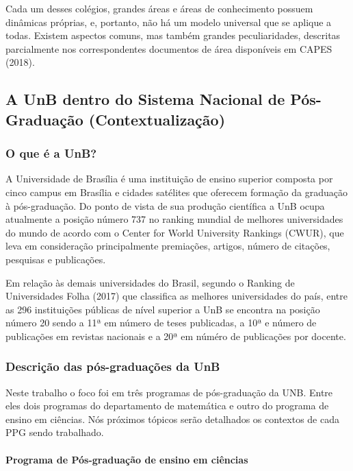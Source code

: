 \documentclass[]{article}
\let\oldparagraph\paragraph
\renewcommand{\paragraph}[1]{\oldparagraph{#1}\mbox{}}
\begin{document}
Cada um desses colégios, grandes áreas e áreas de conhecimento possuem
dinâmicas próprias, e, portanto, não há um modelo universal que se
aplique a todas. Existem aspectos comuns, mas também grandes
peculiaridades, descritas parcialmente nos correspondentes documentos de
área disponíveis em CAPES (2018).

\subsection{A UnB dentro do Sistema Nacional de Pós-Graduação
(Contextualização)}\label{a-unb-dentro-do-sistema-nacional-de-pos-graduacao-contextualizacao}

\subsubsection{O que é a UnB?}\label{o-que-e-a-unb}

A Universidade de Brasília é uma instituição de ensino superior composta
por cinco campus em Brasília e cidades satélites que oferecem formação
da graduação à pós-graduação. Do ponto de vista de sua produção
científica a UnB ocupa atualmente a posição número 737 no ranking
mundial de melhores universidades do mundo de acordo com o Center for
World University Rankings (CWUR), que leva em consideração
principalmente premiações, artigos, número de citações, pesquisas e
publicações.

Em relação às demais universidades do Brasil, segundo o Ranking de
Universidades Folha (2017) que classifica as melhores universidades do
país, entre as 296 instituições públicas de nível superior a UnB se
encontra na posição número 20 sendo a 11ª em número de teses publicadas,
a 10ª e número de publicações em revistas nacionais e a 20ª em núméro de
publicações por docente.

\subsubsection{Descrição das pós-graduações da
UnB}\label{descricao-das-pos-graduacoes-da-unb}

Neste trabalho o foco foi em três programas de pós-graduação da UNB.
Entre eles dois programas do departamento de matemática e outro do
programa de ensino em ciências. Nós próximos tópicos serão detalhados os
contextos de cada PPG sendo trabalhado.

\paragraph{Programa de Pós-graduação de ensino em
ciências}\label{programa-de-pos-graduacao-de-ensino-em-ciencias}
\end{document}
